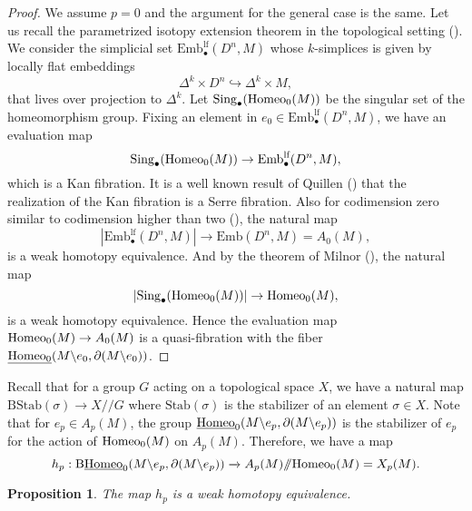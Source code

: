 \documentclass[a4paper]{amsart}
\newtheorem{prop}[thm]{Proposition}
\theoremstyle{definition}
\theoremstyle{remark}
\newcommand{\hcoker}{/\!\!/}
\newcommand{\tH}{\text{\textnormal{Homeo}}}
\newcommand{\BwH}{\mathrm{B}\underline{\text{\textnormal{Homeo}}}}
\newcommand{\wH}{\underline{\text{\textnormal{Homeo}}}}
\numberwithin{equation}{section}
\begin{document}
\begin{proof} We assume $p=0$ and the argument for the general case is the same. Let us recall the parametrized isotopy extension theorem in the topological setting (\cite[page 19]{burghelea1974homotopy}). We consider the simplicial set $\text{Emb}^{\text{lf}}_{\bullet}(D^n,M)$ whose $k$-simplices is given by locally flat embeddings $$\Delta^k\times D^n\hookrightarrow \Delta^k\times M,$$ that lives over projection to $\Delta^k$. Let $\text{Sing}_{\bullet}(\tH_0(M))$ be the singular set of the homeomorphism group. Fixing an element in  $e_0\in\text{Emb}^{\text{lf}}_{\bullet}(D^n,M)$, we have an evaluation map
\[
\text{Sing}_{\bullet}(\tH_0(M))\to \text{Emb}^{\text{lf}}_{\bullet}(D^n,M),
\]
which is a Kan fibration. It is a well known result of Quillen (\cite{MR0238322}) that the realization of the Kan fibration is a Serre fibration. Also for codimension zero similar to codimension higher than two (\cite[Appendix]{lashof1976}), the natural map
\[
|\text{Emb}^{\text{lf}}_{\bullet}(D^n,M)|\to \text{Emb}(D^n,M)=A_0(M),
\]
is a weak homotopy equivalence. And by the theorem of Milnor (\cite{MR0084138}), the natural map 
\[
|\text{Sing}_{\bullet}(\tH_0(M))|\to \tH_0(M),
\]
is a weak homotopy equivalence. Hence the evaluation map $\tH_0(M)\to A_0(M)$ is a quasi-fibration with the fiber $\underline{\tH_{0}}(M\backslash e_0,\partial(M\backslash e_0))$.
\end{proof}
Recall that for a group $G$ acting on a topological space $X$, we have a natural map $\mathrm{B}\text{Stab}(\sigma)\to X\hcoker G$ where $\text{Stab}(\sigma)$ is the stabilizer of an element $\sigma\in X$. Note that for $e_p\in A_p(M)$, the group $\wH_{0}(M\backslash e_p,\partial(M\backslash e_p))$ is the stabilizer of $e_p$ for the action of $\tH_0(M)$ on $A_p(M)$. Therefore, we have a map 
\begin{equation}\label{eq2}
h_p: \BwH_{0}(M\backslash e_p,\partial(M\backslash e_p))\xrightarrow{}A_p(M)\hcoker \tH_0(M)=X_p(M).
\end{equation}
\begin{prop}\label{prop1}
The map $h_p$ is a weak homotopy equivalence.
\end{prop}
\end{document}
